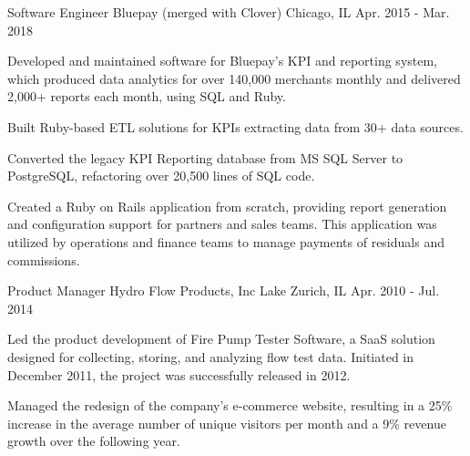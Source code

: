 \begin{cventries}

    \cventry
    {Software Engineer} %
    {Bluepay (merged with Clover)} %
    {Chicago, IL} %
    {Apr. 2015 - Mar. 2018} %
    {
        \begin{cvitems} %
            \item {Developed and maintained software for Bluepay's KPI and reporting system, which produced data analytics for over 140,000 merchants monthly and delivered 2,000+ reports each month, using SQL and Ruby.}
            \item {Built Ruby-based ETL solutions for KPIs extracting data from 30+ data sources.}
            \item {Converted the legacy KPI Reporting database from MS SQL Server to PostgreSQL, refactoring over 20,500 lines of SQL code.}
            \item {Created a Ruby on Rails application from scratch, providing report generation and configuration support for partners and sales teams. This application was utilized by operations and finance teams to manage payments of residuals and commissions.}
        \end{cvitems}
    }


    \cventry
    {Product Manager} %
    {Hydro Flow Products, Inc} %
    {Lake Zurich, IL} %
    {Apr. 2010 - Jul. 2014} %
    {
        \begin{cvitems} %
            \item {Led the product development of Fire Pump Tester Software, a SaaS solution designed for collecting, storing, and analyzing flow test data. Initiated in December 2011, the project was successfully released in 2012.}
            \item {Managed the redesign of the company's e-commerce website, resulting in a 25\% increase in the average number of unique visitors per month and a 9\% revenue growth over the following year.}
        \end{cvitems}
    }

\end{cventries}
